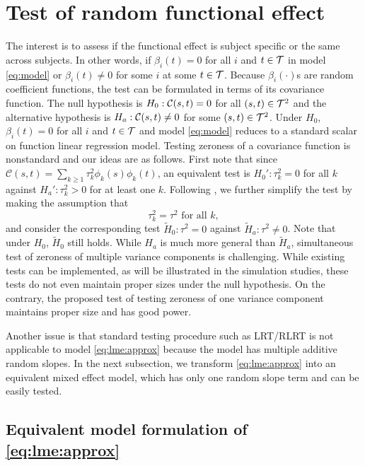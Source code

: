 \section{Test of random functional effect}
The interest is to assess if the functional
effect is subject specific or the same across subjects.
In other words, if $\beta_i(t) =0$ for all $i$ and $t\in \mathcal{T}$ in model \eqref{eq:model}
or $\beta_i(t)\neq 0$ for some $i$ at some $t\in \mathcal{T}$. 
Because $\beta_i(\cdot)$s are random coefficient functions,
the test can be formulated in terms of its covariance function.
The null hypothesis is $H_0: \mathcal{C}(s,t) = 0$ for all $(s,t)\in \mathcal{T}^2$
and the alternative hypothesis is $H_a: \mathcal{C}(s,t)\neq 0$ for some $(s,t)\in \mathcal{T}^2$.
Under $H_0$,  $\beta_i(t)=0$ for all $i$ and $t\in\mathcal{T}$ and model \eqref{eq:model}
reduces to a standard scalar on function linear regression model. Testing zeroness of a covariance function
is nonstandard and our ideas are as follows.
First note that since
$\mathcal{C}(s,t) = \sum_{k\geq 1} \tau_k^2 \phi_k(s)\phi_k(t)$, 
an equivalent test is
$H_0': \tau_k^2 = 0$ for all $k$ against
$H_a': \tau_k^2 > 0$ for at least one $k$.
Following \cite{mclean2015restricted}, we further simplify the test by making the assumption that
\begin{equation}\label{eq:equalVar}
\tau_k^2 = \tau^2 \text{ for all }  k, 
\end{equation}
and consider the corresponding test
$\tilde{H}_0: \tau^2 = 0$ against $\tilde{H}_a: \tau^2 \neq 0$.
Note that under $H_0$, $\tilde{H}_0$ still holds. While $H_a$ is much more general than $\tilde{H}_a$,
simultaneous test of zeroness of multiple variance components is challenging.
While existing tests can be implemented,
as will be illustrated in the simulation studies, these tests do not even
maintain proper sizes under the null hypothesis. 
On the contrary, the proposed test of testing zeroness of one variance component
maintains proper size and has good power.

Another issue is that standard testing procedure such as LRT/RLRT is not applicable to model \eqref{eq:lme:approx} because the model
has multiple additive random slopes. In the next subsection, we transform \eqref{eq:lme:approx}
into an equivalent mixed effect model, which has only one random slope term and can be
easily tested.


\subsection{Equivalent model formulation of \eqref{eq:lme:approx}}

